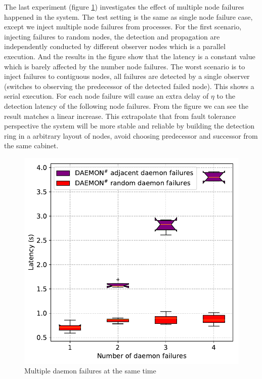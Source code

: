 \documentclass[sigconf]{acmart}
\begin{document}
The last experiment (figure \ref{fig:multi_daemon_failure_nacl}) investigates the effect of multiple node failures happened in the system. The test setting is the same as single node failure case, except we inject multiple node failures from processes. For the first scenario, injecting failures to random nodes, the detection and propagation are independently conducted by different observer nodes which is a parallel execution. And the results in the figure show that the latency is a constant value which is barely affected by the number node failures. The worst scenario is to inject failures to contiguous nodes, all failures are detected by a single observer (switches to observing the predecessor of the detected failed node). This shows a serial execution. For each node failure will cause an extra delay of $ \eta $ to the detection latency of the following node failures. From the figure we can see the result matches a linear increase. This extrapolate that from fault tolerance perspective the system will be more stable and reliable by building the detection ring in a arbitrary layout of nodes, avoid choosing predecessor and successor from the same cabinet.  

\begin{figure}[h]
  \centering
  \includegraphics[width=\linewidth]{multi_daemon_failures.pdf}
  \caption{Multiple daemon failures at the same time}
  \label{fig:multi_daemon_failure_nacl}
\end{figure}
\end{document}
